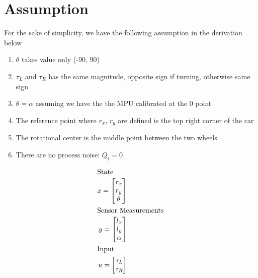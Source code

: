 \documentclass[12pt, letterpaper]{amsart} %
\numberwithin{equation}{section}
\begin{document}
\newpage
\section{Assumption}
For the sake of simplicity, we have the following assumption in the derivation below
\begin{enumerate}
\item $\theta$ takes value only (-90, 90)
\item $\tau_L$ and $\tau_R$ has the same magnitude, opposite sign if turning, otherwise same sign 
\item $\theta = \alpha$ assuming we have the the MPU calibrated at the 0 point
\item The reference point where $r_x$, $r_y$ are defined is the top right corner of the car
\item The rotational center is the middle point between the two wheels
\item There are no process noise: $Q_t = 0$
\end{enumerate}  



\begin{align*}
  \intertext{State}
  x = 
  \begin{bmatrix}
    r_x \\
    r_y \\
    \theta 
  \end{bmatrix} \\
  \intertext{Sensor Measurements}
  y = 
  \begin{bmatrix}
    l_x \\
    l_y \\
    \alpha
  \end{bmatrix} \\
  \intertext{Input}
  u = 
  \begin{bmatrix}
    \tau_L \\
    \tau_R
  \end{bmatrix} \\  
\end{align*}
\end{document}
